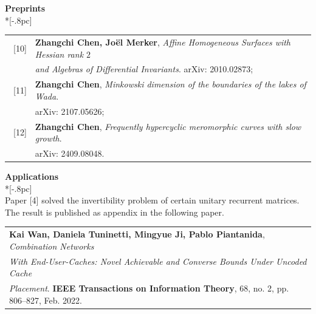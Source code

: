 \documentclass[12pt]{article}
\begin{document}
\medskip

{\large \bf Preprints} \\*[-.8pc]
\underline{\hspace{6.6in}}
\begin{tabular}{ll}
~[10] & {\bf Zhangchi Chen, Joël Merker}, {\em Affine Homogeneous Surfaces with Hessian rank $2$}\\
& {\em and Algebras of Differential Invariants}. arXiv: 2010.02873;\\

~[11] & {\bf Zhangchi Chen}, {\em Minkowski dimension of the boundaries of the lakes of Wada}.\\
&  arXiv: 2107.05626;\\

~[12] & {\bf Zhangchi Chen}, {\em Frequently hypercyclic meromorphic curves with slow growth}.\\
&  arXiv: 2409.08048.

\end{tabular}

\medskip

{\large \bf Applications} \\*[-.8pc]
\underline{\hspace{6.6in}} \\
Paper [4] solved the invertibility problem of certain unitary recurrent matrices.\\
The result is published as appendix in the following paper.\\
\hspace{-30pt}
\begin{tabular}{l}
 {\bf Kai Wan, Daniela Tuninetti, Mingyue Ji, Pablo Piantanida}, {\em Combination Networks }\\
 {\em  With End-User-Caches: Novel Achievable and Converse Bounds Under Uncoded Cache}\\
 {\em   Placement}. {\bf IEEE Transactions on Information Theory}, 68, no. 2, pp. 806--827, Feb. 2022.
\end{tabular}

\medskip
\end{document}
